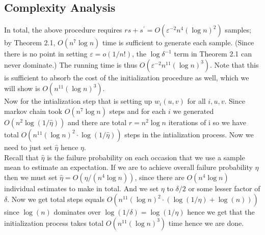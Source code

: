 \subsection{Complexity Analysis }
\begin{flushleft}
	In total, the above procedure requires $r s+s^{\prime}=O\left(\varepsilon^{-2} n^4(\log n)^2\right)$ samples; by Theorem 2.1, $O\left(n^7 \log n\right)$ time is sufficient to generate each sample. (Since there is no point in setting $\varepsilon=o(1 / n!)$, the $\log \delta^{-1}$ term in Theorem 2.1 can never dominate.) The running time is thus $O\left(\varepsilon^{-2} n^{11}(\log n)^3\right)$. Note that this is sufficient to absorb the cost of the initialization procedure as well, which we will show is $O\left(n^{11}(\log n)^3\right)$.\\
	Now for the intialization step that is setting up $w_i(u,v)$ for all $i,u,v$.
	Since markov chain took $O(n^7 \log n )$ steps and for each $i$ we generated $O(n^2\log(1/\hat{\eta}))$ and there are total $r=n^2 \log{n}$ iterations of i so we have total $O(n^{11} (\log{n})^2 \cdot \log(1/\hat{\eta}))$ steps in the intialization process. Now we need to just set $\hat{\eta}$ hence $\eta$.\\
	Recall that $\hat{\eta}$ is the failure probability on each occasion that we use a sample mean to estimate an expectation. If we are to achieve overall failure probability $\eta$ then we must set $\hat{\eta}=O\left(\eta /\left(n^4 \log n\right)\right)$, since there are $O\left(n^4 \log n\right)$ individual estimates to make in total. And we set $\eta$ to $\delta/2$ or some lesser factor of $\delta$. Now we get total steps equals
	$O(n^{11} (\log{n})^2 \cdot (\log(1/\eta)+ \log(n)))$ since $\log(n)$ dominates over $\log(1/\delta)=\log(1/\eta)$ hence we get that the initialization process takes total $O\left(n^{11}(\log n)^3\right)$ time hence we are done.
\end{flushleft}
